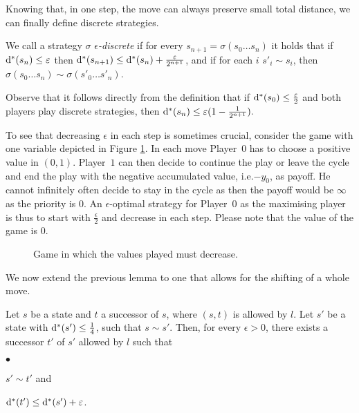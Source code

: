 \documentclass[fleqn,envcountsame]{LMCS}
\newcommand{\ie}{i.e.\xspace}
\newcommand{\pzero}{Player~$0$\xspace}
\newcommand{\pone}{Player~$1$\xspace}
\begin{document}
Knowing that, in one step, the move can always preserve small
total distance, we can finally define discrete strategies.

\begin{defi} \label{edisc}
We call a strategy $\sigma$ \emph{$\epsilon$-discrete}
if for every $s_{n+1} = \sigma(s_0 \ldots s_n)$ it holds that
if $\mathrm{d^*}(s_n) \leq \varepsilon$ then
$\mathrm{d^*}(s_{n+1}) \leq \mathrm{d^*}(s_n) + \frac{\varepsilon}{2^{n+1}}$, and if for each $i$
$s'_i \sim s_i$, then $\sigma(s_0 \ldots s_n) \sim \sigma(s'_0 \ldots s'_n)$.
\end{defi}

Observe that it follows directly from the definition that if
$\mathrm{d^*}(s_0) \leq \frac{\varepsilon}{2}$ and both players play discrete
strategies, then $\mathrm{d^*}(s_{n}) \leq \varepsilon (1 - \frac 1 {2^{n+1}}).$

\begin{exa}
To see that decreasing $\epsilon$ in each step is sometimes crucial,
consider the game with one variable depicted in Figure \ref{fig-eps-need}.
In each move \pzero has to choose a positive value in $(0,1)$.
\pone can then decide to continue the play or leave the
cycle and end the play with the negative accumulated
value, \ie $-y_0$, as payoff. He cannot infinitely
often decide to stay in the cycle as then the payoff
would be $\infty$ as the priority is $0$.
An $\epsilon$-optimal strategy for \pzero as the maximising player
is thus to start with $\frac \epsilon 2$ and decrease in each step.
Please note that the value of the game is $0$.

\begin{figure}[h]
\begin{center}
\end{center}
\caption{Game in which the values played must decrease.}
\label{fig-eps-need}
\end{figure}
\end{exa}

We now extend the previous lemma to one that allows for the shifting of a whole move.
\begin{lem}\label{discrete_succ2}
Let $s$ be a state and $t$ a successor of $s$,
where $(s,t)$ is allowed by $l$.
Let $s'$ be a state with $\mathrm{d^*}(s') \leq \frac 1 4$, such that $s \sim s'$. 
Then, for every $\epsilon > 0$, there exists a successor $t'$ of $s'$
allowed by $l$ such that
\begin{iteMize}{$\bullet$}
\item $s' \sim t'$ and
\item $\mathrm{d^*}(t') \leq \mathrm{d^*}(s') + \varepsilon$.
\end{iteMize}
\end{lem}
\end{document}
